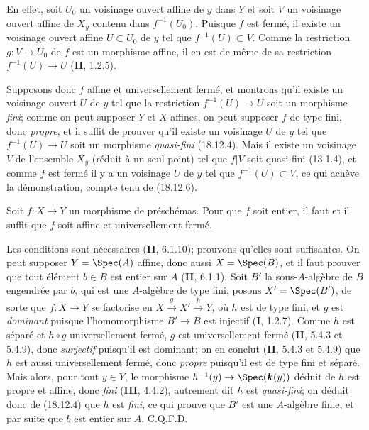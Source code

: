 En effet, soit $U_0$ un voisinage ouvert affine de $y$ dans $Y$ et soit $V$ un voisinage ouvert affine de $X_y$ contenu dans $f^{-1}(U_0)$. Puisque $f$ est fermé, il existe un voisinage ouvert affine $U\subset U_0$ de $y$ tel que $f^{-1}(U)\subset V$. Comme la restriction $g:V\to U_0$ de $f$ est un morphisme affine, il en est de même de sa restriction $f^{-1}(U)\to U$ (\textbf{II}, 1.2.5).

Supposons donc $f$ affine et universellement fermé, et montrons qu'il existe un voisinage ouvert $U$ de $y$ tel que la restriction $f^{-1}(U)\to U$ soit un morphisme \emph{fini}; comme on peut supposer $Y$ et $X$ affines, on peut supposer $f$ de type fini, donc \emph{propre}, et il suffit de prouver qu'il existe un voisinage $U$ de $y$ tel que $f^{-1}(U)\to U$ soit un morphisme \emph{quasi-fini} (18.12.4). Mais il existe un voisinage $V$ de l'ensemble $X_y$ (réduit à un seul point) tel que $f|V$ soit quasi-fini (13.1.4), et comme $f$ est fermé il y a un voisinage $U$ de $y$ tel que $f^{-1}(U)\subset V$, ce qui achève la démonstration, compte tenu de (18.12.6).

\begin{proposition}[18.12.8]
\label{IV.18.12.8}
Soit $f:X\to Y$ un morphisme de préschémas. Pour que $f$ soit entier, il faut et il suffit que $f$ soit affine et universellement fermé.
\end{proposition}

Les conditions sont nécessaires (\textbf{II}, 6.1.10); prouvons qu'elles sont suffisantes. On peut supposer $Y=\Spec(A)$ affine, donc aussi $X=\Spec(B)$, et il faut prouver que tout élément $b\in B$ est entier sur $A$ (\textbf{II}, 6.1.1). Soit $B'$ la sous-$A$-algèbre de $B$ engendrée par $b$, qui est une $A$-algèbre de type fini; posons $X'=\Spec(B')$, de sorte que $f:X\to Y$ se factorise en $X\xrightarrow{g}X'\xrightarrow{h}Y$, où $h$ est de type fini, et $g$ est \emph{dominant} puisque l'homomorphisme $B'\to B$ est injectif (\textbf{I}, 1.2.7). Comme $h$ est séparé et $h\circ g$ universellement fermé, $g$ est universellement fermé (\textbf{II}, 5.4.3 et
5.4.9), donc \emph{surjectif} puisqu'il est dominant; on en conclut (\textbf{II}, 5.4.3 et 5.4.9) que $h$ est aussi universellement fermé, donc \emph{propre} puisqu'il est de type fini et séparé. Mais alors, pour tout $y\in Y$, le morphisme $h^{-1}(y)\to\Spec(\boldsymbol{k}(y))$ déduit de $h$ est propre et affine, donc \emph{fini} (\textbf{III}, 4.4.2), autrement dit $h$ est \emph{quasi-fini}; on déduit donc de (18.12.4) que $h$ est \emph{fini}, ce qui prouve que $B'$ est une $A$-algèbre finie, et par suite que $b$ est entier sur $A$. C.Q.F.D.

